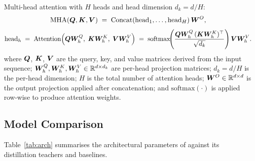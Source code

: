 Multi-head attention with $H$ heads and head dimension $d_k = d / H$:
\begin{equation}
  \text{MHA}(\bm{Q},\bm{K},\bm{V})
  \;=\;
  \text{Concat}\!\left(\text{head}_1,\ldots,\text{head}_H\right)\bm{W}^O,
  \label{eq:mha}
\end{equation}
\begin{equation}
  \text{head}_h
  \;=\;
  \text{Attention}\!\left(\bm{Q}\bm{W}^Q_h,\;\bm{K}\bm{W}^K_h,\;\bm{V}\bm{W}^V_h\right)
  \;=\;
  \text{softmax}\!\!\left(\frac{\bm{Q}\bm{W}^Q_h\,(\bm{K}\bm{W}^K_h)^\top}{\sqrt{d_k}}\right)
  \bm{V}\bm{W}^V_h.
  \label{eq:attention}
\end{equation}
\noindent where $\bm{Q}$, $\bm{K}$, $\bm{V}$ are the query, key, and value matrices derived from the input sequence; $\bm{W}^Q_h, \bm{W}^K_h, \bm{W}^V_h \in \mathbb{R}^{d \times d_k}$ are per-head projection matrices; $d_k = d / H$ is the per-head dimension; $H$ is the total number of attention heads; $\bm{W}^O \in \mathbb{R}^{d \times d}$ is the output projection applied after concatenation; and $\text{softmax}(\cdot)$ is applied row-wise to produce attention weights.

\subsection{Model Comparison}

Table~\ref{tab:arch} summarises the architectural parameters of
\LightRet{} against its distillation teachers and baselines.

\begin{table}[h]
\centering
\caption{Architecture comparison. \textbf{Vocab} = requires tokenizer vocabulary.}
\label{tab:arch}
\end{table}

